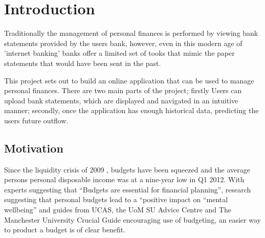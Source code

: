 \chapter{Introduction}

\begin{comment}
This chapter puts the work into context. Having read it, the reader should be left in no doubt as to:

- the topic area to which the work applies
- why the work is being done
- what else has been done in the area and by whom
 - how the author proposes to tackle the problem: The project proposal is often expressed in terms of a main objective and possibly one or more additional objectives. It is useful to define "milestones" or "sub-goals" that mark the progress towards the objectives. 
 - It is common to end this chapter with a brief overview of each of the subsequent chapters of the report.
\end{comment}

Traditionally the management of personal finances is performed by viewing bank statements provided by the users bank, however, even in this modern age of 'internet banking' banks offer a limited set of tooks that mimic the paper statements that would have been sent in the past.

This project sets out to build an online application that can be used to manage personal finances. There are two main parts of the project; firstly Users can upload  bank statements, which are displayed and navigated in an intuitive manner; secondly, once the application has enough historical data, predicting the users future outflow.

\section{Motivation}


Since the liquidity crisis of 2009 \cite{gore2010}, budgets have been squeezed and the average persons personal disposable income was at a nine-year low in Q1 2012\cite{barnard2012}. With experts suggesting that ``Budgets are essential for financial planning''\cite{wsj2013budget}, research suggesting that personal budgets lead to a ``positive impact on ``mental wellbeing''\cite{tlap2013budget} and guides from UCAS, the UoM SU Advice Centre and The Manchester University Crucial Guide encouraging use of budgeting, an easier way to product a budget is of clear benefit.

